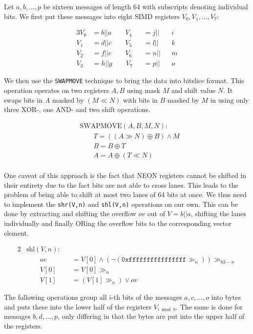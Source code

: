 Let $a,b,\dots,p$ be sixteen messages of length $64$ with subscripts denoting
individual bits. We first put these messages into eight SIMD registers
$V_0,V_1,\dots,V_7$:

\begin{alignat*}{3}
    V_0&=b||a\qquad V_4&&=j||&&i \\
    V_1&=d||c\qquad V_5&&=l||&&k \\
    V_2&=f||e\qquad V_6&&=n||&&m \\
    V_3&=h||g\qquad V_7&&=p||&&o
\end{alignat*}

We then use the \texttt{SWAPMOVE} technique to bring the data into bitslice
format. This operation operates on two registers $A,B$ using mask $M$ and shift
value $N$. It swaps bits in $A$ masked by $(M\ll N)$ with bits in $B$ masked by
$M$ in using only three XOR-, one AND- and two shift operations.

\begin{align*}
    &\text{SWAPMOVE}(A,B,M,N): \\
    &\qquad T=((A\gg N)\oplus B)\land M \\
    &\qquad B=B\oplus T \\
    &\qquad A=A\oplus (T\ll N) \\
\end{align*}

One caveat of this approach is the fact that NEON registers cannot be shifted
in their entirety due to the fact bits are not able to cross lanes. This leads
to the problem of being able to shift at most two lanes of 64 bits at once. We
thus need to implement the \texttt{shr(V,n)} and \texttt{shl(V,n)} operations
on our own. This can be done by extracting and shifting the overflow $ov$ out
of $V=b||a$, shifting the lanes individually and finally ORing the overflow
bits to the corresponding vector element.

\begin{alignat*}{2}
    &\text{shl}(V,n): \\
    &\qquad ov&&=V[0]\land(\lnot(\texttt{0xffffffffffffffff}\gg_n))\gg_{63-n} \\
    &\qquad V[0]&&=V[0]\gg_n \\
    &\qquad V[1]&&=(V[1]\gg_n)\lor ov
\end{alignat*}

The following operations group all $i$-th bits of the messages $a,c,\dots,o$
into bytes and puts these into the lower half of the registers $V_{i\bmod 8}$.
The same is done for messages $b,d,\dots,p$, only differing in that the bytes
are put into the upper half of the registers.

